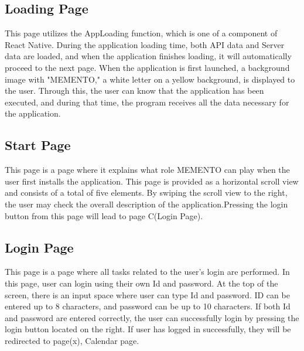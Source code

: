 \documentclass[conference]{IEEEtran}
\begin{document}
\subsection{Loading Page}\label{AA}
This page utilizes the AppLoading function, which is one of a component of React Native. During the application loading time, both API data and Server data are loaded, and when the application finishes loading, it will automatically proceed to the next page. When the application is first launched, a background image with "MEMENTO," a white letter on a yellow background, is displayed to the user. Through this, the user can know that the application has been executed, and during that time, the program receives all the data necessary for the application.
\\
\subsection{Start Page}
This page is a page where it explains what role MEMENTO can play when the user first installs the application. This page is provided as a horizontal scroll view and consists of a total of five 
elements. By swiping the scroll view to the right, the user may check the overall description of the application.Pressing the login button from this page will lead to page C(Login Page).
\\
\subsection{Login Page}
This page is a page where all tasks related to the user's login are performed. In this page, user can login using their own Id and password. At the top of the screen, there is an input space where user can type Id and password. ID can be entered up to 8 characters, and password can be up to 10 characters. If both Id and password are entered correctly, the user can successfully login by pressing the login button located on the right. If user has logged in successfully, they will be redirected to page(x), Calendar page.\\
\\
\end{document}
